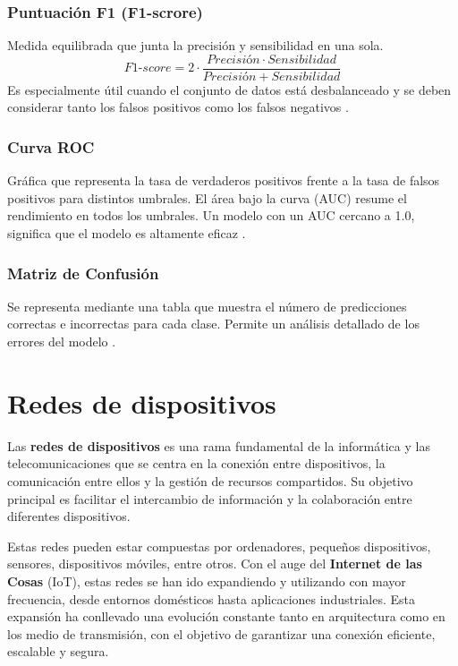 \subsubsection{Puntuación F1 (F1-scrore)}
\label{subsubsec:f1_score}
Medida equilibrada que junta la precisión y sensibilidad en una sola.
\[\textit{F1-score} = 2 \cdot \frac{Precisión \cdot Sensibilidad}{Precisión + Sensibilidad}\]
Es especialmente útil cuando el conjunto de datos está desbalanceado y se deben considerar tanto los falsos positivos como los falsos negativos \cite{metricas}.

\subsubsection{Curva ROC}
\label{subsubsec:roc_curve}
Gráfica que representa la tasa de verdaderos positivos frente a la tasa de falsos positivos para distintos umbrales. El área bajo la curva (AUC) resume el rendimiento en todos los umbrales. Un modelo con un AUC cercano a 1.0, significa que el modelo es altamente eficaz \cite{roc}.

\subsubsection{Matriz de Confusión}
\label{subsubsec:roc_curve}
Se representa mediante una tabla que muestra el número de predicciones correctas e incorrectas para cada clase. Permite un análisis detallado de los errores del modelo \cite{matriz}.


\section{Redes de dispositivos}
\label{sec:Redes}
Las \textbf{redes de dispositivos} es una rama fundamental de la informática y las telecomunicaciones que se centra en la conexión entre dispositivos, la comunicación entre ellos y la gestión de recursos compartidos. Su objetivo principal es facilitar el intercambio de información y la colaboración entre diferentes dispositivos.

Estas redes pueden estar compuestas por ordenadores, pequeños dispositivos, sensores, dispositivos móviles, entre otros. Con el auge del \textbf{Internet de las Cosas} (IoT), estas redes se han ido expandiendo y utilizando con mayor frecuencia, desde entornos domésticos hasta aplicaciones industriales. Esta expansión ha conllevado una evolución constante tanto en arquitectura como en los medio de transmisión, con el objetivo de garantizar una conexión eficiente, escalable y segura.

